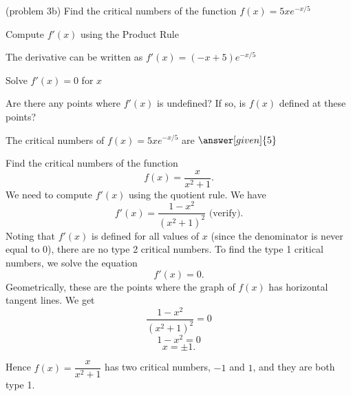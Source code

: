 \documentclass{ximera}
\begin{document}
\begin{problem}(problem 3b)
  Find the critical numbers of the function $f(x) = 5xe^{-x/5}$
  
  
    \begin{hint}
      Compute $f'(x)$ using the Product Rule
    \end{hint}
    \begin{hint}
      The derivative can be written as $f'(x) = (-x + 5)e^{-x/5}$
    \end{hint}
		\begin{hint}
      Solve $f'(x) = 0$ for $x$
    \end{hint}
    \begin{hint}
      Are there any points where $f'(x)$ is undefined?
      If so, is $f(x)$ defined at these points?  
		\end{hint}
    
    
		The critical numbers of $f(x) = 5xe^{-x/5}$ are
		 $\answer[given]{5}$
		
\end{problem}




\begin{example}[example 4] Find the critical numbers of the function 
\[f(x) = \dfrac{x}{x^2 +1}.\]
We need to compute $f'(x)$ using the quotient rule.  We have
\[f'(x) = \frac{1-x^2}{(x^2+1)^2} \mbox{   (verify)}.\]
Noting that $f'(x)$ is defined for all values of $x$ (since the denominator is never equal to 0), 
there are no type 2 critical numbers.
To find the type 1 critical numbers, we solve the equation
\[f'(x) = 0.\]
Geometrically, these are the points where the graph of $f(x)$ has horizontal tangent lines.
We get
\[ \frac{1-x^2}{(x^2+1)^2} =0\]
\[ 1-x^2 =0\]
\[x = \pm 1.\]

Hence $f(x) = \dfrac{x}{x^2 +1}$ has two critical numbers, $-1$ and $1$, and they are both type 1. 

\begin{image}
\end{image}

\end{example}
\end{document}
